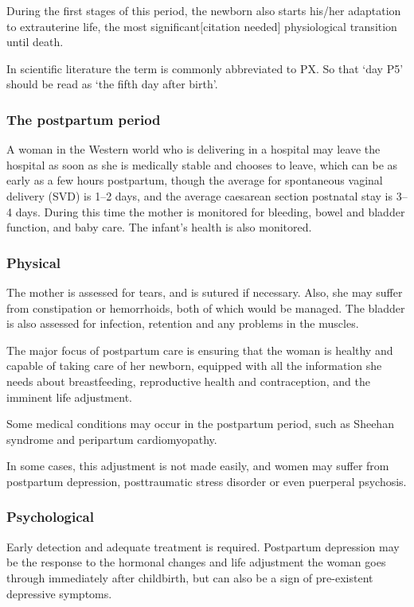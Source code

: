 \documentclass[12pt,a4paper,onecolumn]{article}
\begin{document}
During the first stages of this period, the newborn also starts his/her adaptation to extrauterine
life, the most significant$[$citation needed$]$ physiological transition until death.

In scientific literature the term is commonly abbreviated to PX. So that `day P5' should be read as
`the fifth day after birth'.

\subsubsection{The postpartum period}

A woman in the Western world who is delivering in a hospital may leave the hospital as soon as she
is medically stable and chooses to leave, which can be as early as a few hours postpartum, though
the average for spontaneous vaginal delivery (SVD) is 1–2 days, and the average caesarean section
postnatal stay is 3–4 days. During this time the mother is monitored for bleeding, bowel and bladder
function, and baby care. The infant's health is also monitored.

\subsubsection{Physical}

The mother is assessed for tears, and is sutured if necessary. Also, she may suffer from
constipation or hemorrhoids, both of which would be managed. The bladder is also assessed for
infection, retention and any problems in the muscles.

The major focus of postpartum care is ensuring that the woman is healthy and capable of taking care
of her newborn, equipped with all the information she needs about breastfeeding, reproductive health
and contraception, and the imminent life adjustment.

Some medical conditions may occur in the postpartum period, such as Sheehan syndrome and peripartum
cardiomyopathy.

In some cases, this adjustment is not made easily, and women may suffer from postpartum depression,
posttraumatic stress disorder or even puerperal psychosis.

\subsubsection{Psychological}

Early detection and adequate treatment is required. Postpartum depression may be the response to the
hormonal changes and life adjustment the woman goes through immediately after childbirth, but can
also be a sign of pre-existent depressive symptoms.
\end{document}
